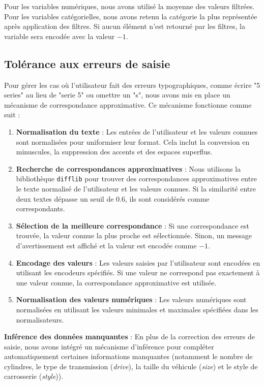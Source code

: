 \documentclass[12pt]{report}
\begin{document}
Pour les variables numériques, nous avons utilisé la moyenne des valeurs filtrées. Pour les variables catégorielles, nous avons retenu la catégorie la plus représentée après application des filtres. Si aucun élément n'est retourné par les filtres, la variable sera encodée avec la valeur \(-1\).


\subsection{Tolérance aux erreurs de saisie}

Pour gérer les cas où l'utilisateur fait des erreurs typographiques, comme écrire "5 series" au lieu de "serie 5" ou omettre un "s", nous avons mis en place un mécanisme de correspondance approximative. Ce mécanisme fonctionne comme suit :

\begin{enumerate}
    \item \textbf{Normalisation du texte} : Les entrées de l'utilisateur et les valeurs connues sont normalisées pour uniformiser leur format. Cela inclut la conversion en minuscules, la suppression des accents et des espaces superflus.
    \item \textbf{Recherche de correspondances approximatives} : Nous utilisons la bibliothèque \texttt{difflib} pour trouver des correspondances approximatives entre le texte normalisé de l'utilisateur et les valeurs connues. Si la similarité entre deux textes dépasse un seuil de 0.6, ils sont considérés comme correspondants.
    \item \textbf{Sélection de la meilleure correspondance} : Si une correspondance est trouvée, la valeur connue la plus proche est sélectionnée. Sinon, un message d'avertissement est affiché et la valeur est encodée comme \(-1\).
    \item \textbf{Encodage des valeurs} : Les valeurs saisies par l'utilisateur sont encodées en utilisant les encodeurs spécifiés. Si une valeur ne correspond pas exactement à une valeur connue, la correspondance approximative est utilisée.
    \item \textbf{Normalisation des valeurs numériques} : Les valeurs numériques sont normalisées en utilisant les valeurs minimales et maximales spécifiées dans les normalisateurs.
\end{enumerate}

\textbf{Inférence des données manquantes} :  
En plus de la correction des erreurs de saisie, nous avons intégré un mécanisme d'inférence pour compléter automatiquement certaines informations manquantes (notamment le nombre de cylindres, le type de transmission (\textit{drive}), la taille du véhicule (\textit{size}) et le style de carrosserie (\textit{style})).
\end{document}

